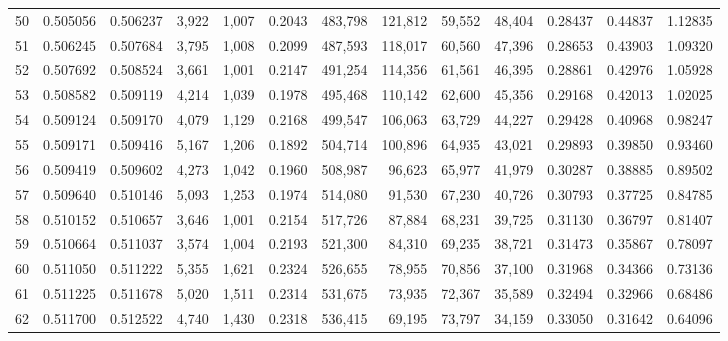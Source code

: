 \begin{tabular}{rrrrrrrrrrrrr}
50 &  0.505056 &  0.506237 &   3,922 &  1,007 &                                     0.2043 &  483,798 &  121,812 &   59,552 &   48,404 &  0.28437 &  0.44837 &  1.12835 \\
51 &  0.506245 &  0.507684 &   3,795 &  1,008 &                                     0.2099 &  487,593 &  118,017 &   60,560 &   47,396 &  0.28653 &  0.43903 &  1.09320 \\
52 &  0.507692 &  0.508524 &   3,661 &  1,001 &                                     0.2147 &  491,254 &  114,356 &   61,561 &   46,395 &  0.28861 &  0.42976 &  1.05928 \\
53 &  0.508582 &  0.509119 &   4,214 &  1,039 &                                     0.1978 &  495,468 &  110,142 &   62,600 &   45,356 &  0.29168 &  0.42013 &  1.02025 \\
54 &  0.509124 &  0.509170 &   4,079 &  1,129 &                                     0.2168 &  499,547 &  106,063 &   63,729 &   44,227 &  0.29428 &  0.40968 &  0.98247 \\
55 &  0.509171 &  0.509416 &   5,167 &  1,206 &                                     0.1892 &  504,714 &  100,896 &   64,935 &   43,021 &  0.29893 &  0.39850 &  0.93460 \\
56 &  0.509419 &  0.509602 &   4,273 &  1,042 &                                     0.1960 &  508,987 &   96,623 &   65,977 &   41,979 &  0.30287 &  0.38885 &  0.89502 \\
57 &  0.509640 &  0.510146 &   5,093 &  1,253 &                                     0.1974 &  514,080 &   91,530 &   67,230 &   40,726 &  0.30793 &  0.37725 &  0.84785 \\
58 &  0.510152 &  0.510657 &   3,646 &  1,001 &                                     0.2154 &  517,726 &   87,884 &   68,231 &   39,725 &  0.31130 &  0.36797 &  0.81407 \\
59 &  0.510664 &  0.511037 &   3,574 &  1,004 &                                     0.2193 &  521,300 &   84,310 &   69,235 &   38,721 &  0.31473 &  0.35867 &  0.78097 \\
60 &  0.511050 &  0.511222 &   5,355 &  1,621 &                                     0.2324 &  526,655 &   78,955 &   70,856 &   37,100 &  0.31968 &  0.34366 &  0.73136 \\
61 &  0.511225 &  0.511678 &   5,020 &  1,511 &                                     0.2314 &  531,675 &   73,935 &   72,367 &   35,589 &  0.32494 &  0.32966 &  0.68486 \\
62 &  0.511700 &  0.512522 &   4,740 &  1,430 &                                     0.2318 &  536,415 &   69,195 &   73,797 &   34,159 &  0.33050 &  0.31642 &  0.64096 \\

\end{tabular}
